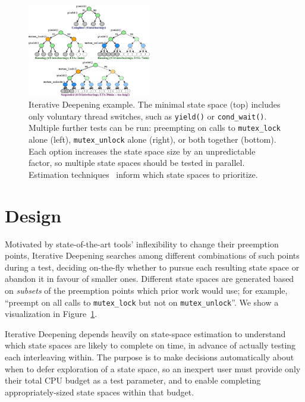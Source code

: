 \begin{figure}[t]
	\includegraphics[width=0.48\textwidth]{trees.pdf}
	\caption{Iterative Deepening example.
		The minimal state space (top) includes only voluntary thread switches, such as {\tt yield()} or {\tt cond\_wait()}.
		Multiple further tests can be run: preempting on calls to {\tt mutex\_lock} alone (left), {\tt mutex\_unlock} alone (right), or both together (bottom).
Each option increases the state space size by an unpredictable factor, so multiple state spaces should be tested in parallel.
Estimation techniques~\cite{estimation} inform which state spaces to prioritize.
}
	\label{fig:id}
\end{figure}
\section{Design}
\label{sec:design}

Motivated by state-of-the-art tools' inflexibility to change their preemption points,
Iterative Deepening searches among different combinations of such points during a test,
deciding on-the-fly whether to pursue each resulting state space or abandon it in favour of smaller ones.
Different state spaces are generated based on {\em subsets} of the preemption points which prior work would use; for example, ``preempt on all calls to {\tt mutex\_lock} but not on {\tt mutex\_unlock}''.
We show a visualization in Figure~\ref{fig:id}.

Iterative Deepening depends heavily on state-space estimation \cite{estimation}
to understand which state spaces are likely to complete on time,
in advance of actually testing each interleaving within.
The purpose is to make decisions automatically about when to defer exploration of a state space,
so an inexpert user must provide only their total CPU budget as a test parameter,
and to enable completing appropriately-sized state spaces within that budget.

